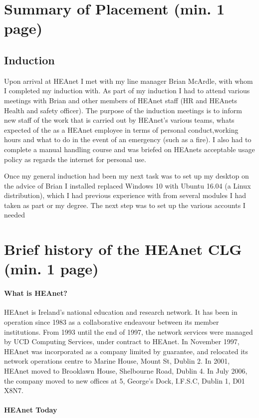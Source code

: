 \documentclass{article}
\begin{document}
\section{Summary of Placement (min. 1 page)}
\subsection{Induction}
Upon arrival at HEAnet I met with my line manager Brian McArdle, with whom I completed my induction with. As part of my induction I had to attend various meetings with Brian and other members of HEAnet staff (HR and HEAnets Health and safety officer). The purpose of the induction meetings is to inform new staff of the work that is carried out by HEAnet's various teams, whats expected of the as a HEAnet employee in terms of personal conduct,working hours and what to do in the event of an emergency (such as a fire). I also had to complete a manual handling course and was briefed on HEAnets acceptable usage policy as regards the internet for personal use.

Once my general induction had been my next task was to set up my desktop on the advice of Brian I installed replaced Windows 10 with Ubuntu 16.04 (a Linux distribution), which I had previous experience with from several modules I had taken as part or my degree. The next step was to set up the various accounts I needed
\newpage
\section{Brief history of the HEAnet CLG (min. 1 page)}

\paragraph{What is HEAnet?}
HEAnet is Ireland's national education and research network. It has been in operation since 1983 as a collaborative endeavour between its member institutions. From 1993 until the end of 1997, the network services were managed by UCD Computing Services, under contract to HEAnet. In November 1997, HEAnet was incorporated as a company limited by guarantee, and relocated its network operations centre to Marine House, Mount St, Dublin 2. In 2001, HEAnet moved to Brooklawn House, Shelbourne Road, Dublin 4. In July 2006, the company moved to new offices at 5, George's Dock, I.F.S.C, Dublin 1, D01 X8N7.

\paragraph{HEAnet Today}
\end{document}
